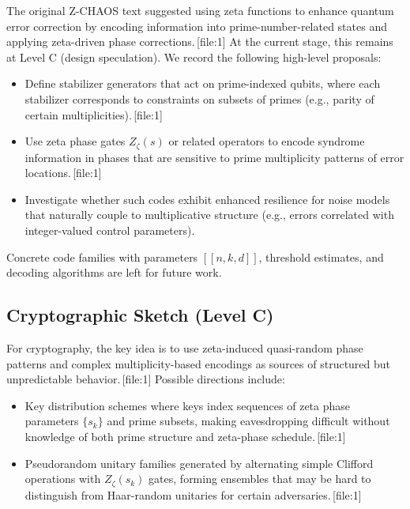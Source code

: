 \documentclass[11pt]{article}
\begin{document}
The original Z-CHAOS text suggested using zeta functions to enhance quantum error correction by encoding information into prime-number-related states and applying zeta-driven phase corrections.\,[file:1] At the current stage, this remains at Level C (design speculation). We record the following high-level proposals:

\begin{itemize}[leftmargin=*]
    \item Define stabilizer generators that act on prime-indexed qubits, where each stabilizer corresponds to constraints on subsets of primes (e.g., parity of certain multiplicities).\,[file:1]
    \item Use zeta phase gates \(Z_\zeta(s)\) or related operators to encode syndrome information in phases that are sensitive to prime multiplicity patterns of error locations.\,[file:1]
    \item Investigate whether such codes exhibit enhanced resilience for noise models that naturally couple to multiplicative structure (e.g., errors correlated with integer-valued control parameters).
\end{itemize}

Concrete code families with parameters \([[n,k,d]]\), threshold estimates, and decoding algorithms are left for future work.

\subsection{Cryptographic Sketch (Level C)}

For cryptography, the key idea is to use zeta-induced quasi-random phase patterns and complex multiplicity-based encodings as sources of structured but unpredictable behavior.\,[file:1] Possible directions include:

\begin{itemize}[leftmargin=*]
    \item Key distribution schemes where keys index sequences of zeta phase parameters \(\{s_k\}\) and prime subsets, making eavesdropping difficult without knowledge of both prime structure and zeta-phase schedule.\,[file:1]
    \item Pseudorandom unitary families generated by alternating simple Clifford operations with \(Z_\zeta(s_k)\) gates, forming ensembles that may be hard to distinguish from Haar-random unitaries for certain adversaries.\,[file:1]
\end{itemize}
\end{document}
